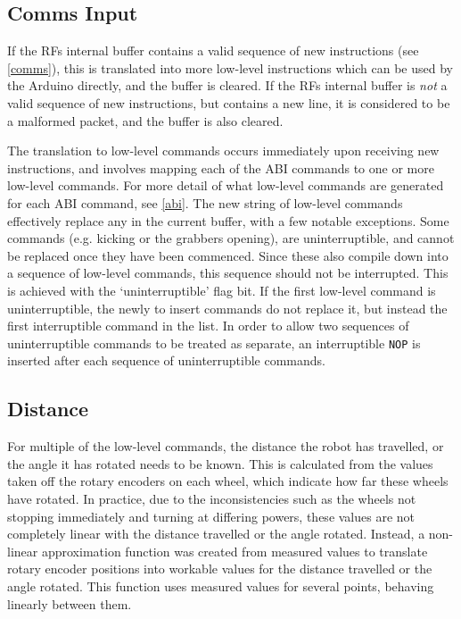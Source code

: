 \subsection{Comms Input}

If the RFs internal buffer contains a valid sequence of new instructions (see
\cref{comms}), this is translated into more low-level instructions which can be
used by the Arduino directly, and the buffer is cleared. If the RFs internal
buffer is \textit{not} a valid sequence of new instructions, but contains a new
line, it is considered to be a malformed packet, and the buffer is also
cleared.

The translation to low-level commands occurs immediately upon receiving new
instructions, and involves mapping each of the ABI commands to one or more
low-level commands. For more detail of what low-level commands are generated
for each ABI command, see \cref{abi}. The new string of low-level commands
effectively replace any in the current buffer, with a few notable exceptions.
Some commands (e.g. kicking or the grabbers opening), are uninterruptible,
and cannot be replaced once they have been commenced. Since these also compile
down into a sequence of low-level commands, this sequence should not be
interrupted. This is achieved with the `uninterruptible' flag bit. If the first
low-level command is uninterruptible, the newly to insert commands do not
replace it, but instead the first interruptible command in the list. In order
to allow two sequences of uninterruptible commands to be treated as separate,
an interruptible \texttt{NOP} is inserted after each sequence of
uninterruptible commands.

\subsection{Distance}

For multiple of the low-level commands, the distance the robot has travelled,
or the angle it has rotated needs to be known. This is calculated from the
values taken off the rotary encoders on each wheel, which indicate how far
these wheels have rotated. In practice, due to the inconsistencies such as the
wheels not stopping immediately and turning at differing powers, these values
are not completely linear with the distance travelled or the angle rotated.
Instead, a non-linear approximation function was created from measured values
to translate rotary encoder positions into workable values for the distance
travelled or the angle rotated. This function uses measured values for several
points, behaving linearly between them.

